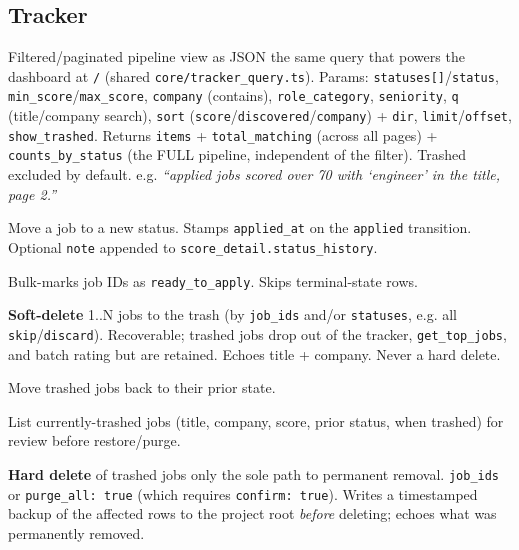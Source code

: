 \documentclass[11pt,letterpaper]{article}
\newcommand{\tool}[1]{\texttt{#1}}
\newcommand{\fpath}[1]{\texttt{#1}}
\begin{document}
\subsection*{Tracker}

\begin{description}[leftmargin=0pt]
\item[\tool{get\_tracker}] Filtered/paginated pipeline view as JSON \textemdash{} the same query that powers the dashboard at \texttt{/} (shared \fpath{core/tracker\_query.ts}). Params: \texttt{statuses[]}/\texttt{status}, \texttt{min\_score}/\texttt{max\_score}, \texttt{company} (contains), \texttt{role\_category}, \texttt{seniority}, \texttt{q} (title/company search), \texttt{sort} (\texttt{score}/\texttt{discovered}/\texttt{company}) + \texttt{dir}, \texttt{limit}/\texttt{offset}, \texttt{show\_trashed}. Returns \texttt{items} + \texttt{total\_matching} (across all pages) + \texttt{counts\_by\_status} (the FULL pipeline, independent of the filter). Trashed excluded by default. e.g. \emph{``applied jobs scored over 70 with `engineer' in the title, page 2.''}
\item[\tool{update\_status}] Move a job to a new status. Stamps \texttt{applied\_at} on the \texttt{applied} transition. Optional \texttt{note} appended to \texttt{score\_detail.status\_history}.
\item[\tool{mark\_ready\_to\_apply}] Bulk-marks job IDs as \texttt{ready\_to\_apply}. Skips terminal-state rows.
\item[\tool{delete\_jobs}] \textbf{Soft-delete} 1..N jobs to the trash (by \texttt{job\_ids} and/or \texttt{statuses}, e.g. all \texttt{skip}/\texttt{discard}). Recoverable; trashed jobs drop out of the tracker, \tool{get\_top\_jobs}, and batch rating but are retained. Echoes title + company. Never a hard delete.
\item[\tool{restore\_jobs}] Move trashed jobs back to their prior state.
\item[\tool{list\_trashed}] List currently-trashed jobs (title, company, score, prior status, when trashed) for review before restore/purge.
\item[\tool{purge\_jobs}] \textbf{Hard delete} of trashed jobs only \textemdash{} the sole path to permanent removal. \texttt{job\_ids} or \texttt{purge\_all: true} (which requires \texttt{confirm: true}). Writes a timestamped backup of the affected rows to the project root \emph{before} deleting; echoes what was permanently removed.
\end{description}
\end{document}
